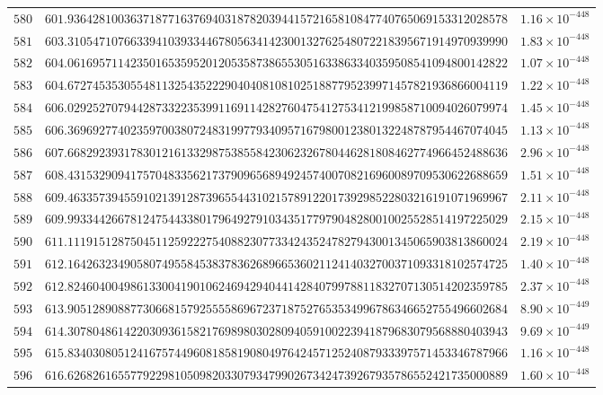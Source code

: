\documentclass[12pt,reqno]{amsart}
\theoremstyle{remark}
\begin{document}
\begin{longtable}{clc}
$580$ & $601.9364281003637187716376940318782039441572165810847740765069153312028578$ & $1.16\times 10^{-448}$ \\
$581$ & $603.3105471076633941039334467805634142300132762548072218395671914970939990$ & $1.83\times 10^{-448}$ \\
$582$ & $604.0616957114235016535952012053587386553051633863340359508541094800142822$ & $1.07\times 10^{-448}$ \\
$583$ & $604.6727453530554811325435222904040810810251887795239971457821936866004119$ & $1.22\times 10^{-448}$ \\
$584$ & $606.0292527079442873322353991169114282760475412753412199858710094026079974$ & $1.45\times 10^{-448}$ \\
$585$ & $606.3696927740235970038072483199779340957167980012380132248787954467074045$ & $1.13\times 10^{-448}$ \\
$586$ & $607.6682923931783012161332987538558423062326780446281808462774966452488636$ & $2.96\times 10^{-448}$ \\
$587$ & $608.4315329094175704833562173790965689492457400708216960089709530622688659$ & $1.51\times 10^{-448}$ \\
$588$ & $609.4633573945591021391287396554431021578912201739298522803216191071969967$ & $2.11\times 10^{-448}$ \\
$589$ & $609.9933442667812475443380179649279103435177979048280010025528514197225029$ & $2.15\times 10^{-448}$ \\
$590$ & $611.1119151287504511259222754088230773342435247827943001345065903813860024$ & $2.19\times 10^{-448}$ \\
$591$ & $612.1642632349058074955845383783626896653602112414032700371093318102574725$ & $1.40\times 10^{-448}$ \\
$592$ & $612.8246040049861330041901062469429404414284079978811832707130514202359785$ & $2.37\times 10^{-448}$ \\
$593$ & $613.9051289088773066815792555586967237187527653534996786346652755496602684$ & $8.90\times 10^{-449}$ \\
$594$ & $614.3078048614220309361582176989803028094059100223941879683079568880403943$ & $9.69\times 10^{-449}$ \\
$595$ & $615.8340308051241675744960818581908049764245712524087933397571453346787966$ & $1.16\times 10^{-448}$ \\
$596$ & $616.6268261655779229810509820330793479902673424739267935786552421735000889$ & $1.60\times 10^{-448}$ \\

\end{longtable}
\end{document}
